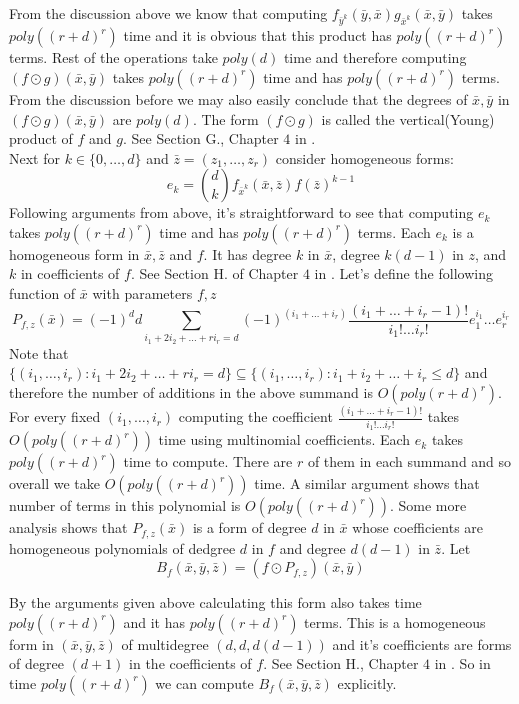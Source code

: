 \documentclass[letterpaper,USenglish,numberwithinsect]{lipics}
\newcommand{\B}[1]{\bar{#1}}
\begin{document}
From the discussion above we know that computing $f_{\B{y}^k}(\B{y},\B{x})g_{\B{x}^k}(\B{x},\B{y})$ takes $poly((r+d)^r)$
time and it is obvious that this product has $poly((r+d)^r)$ terms. Rest of the operations take $poly(d)$ time and therefore
computing $(f\odot g)(\B{x},\B{y})$ takes $poly((r+d)^r)$ time and has $poly((r+d)^r)$ terms. From the discussion before we may also
easily conclude that the degrees of $\B{x},\B{y}$ in $(f\odot g)(\B{x},\B{y})$ are $poly(d)$. The form $(f\odot g)$ is called the
vertical(Young) product of $f$ and $g$. See Section G., Chapter $4$ in \cite{GKZ94}.\\

Next for $k\in \{0,\ldots,d\}$ and $\B{z} = (z_1,\ldots,z_r)$ consider homogeneous forms:
\[
 e_k = {d\choose k}f_{\B{x}^k}(\B{x},\B{z})f(\B{z})^{k-1}
\]
Following arguments from above, it's straightforward to see that computing $e_k$ takes $poly((r+d)^r)$ time and
has $poly((r+d)^r)$ terms.
Each $e_k$ is a homogeneous form in $\B{x},\B{z}$ and $f$. It has degree $k$ in $\B{x}$, degree $k(d-1)$ in $z$, and $k$ in
coefficients of $f$. See Section H. of Chapter $4$ in \cite{GKZ94}. Let's define the following function of $\B{x}$ with parameters $f,z$
\[
 P_{f,z}(\B{x}) = (-1)^dd\sum\limits_{i_1+2i_2+\ldots+ri_r=d}(-1)^{(i_1+\ldots+i_r)}\frac{(i_1+\ldots+i_r-1)!}{i_1!\ldots i_r!}e_1^{i_1}\ldots e_r^{i_r
  }
\]
Note that $\{(i_1,\ldots,i_r) :i_1+2i_2+\ldots+ri_r=d\}\subseteq \{(i_1,\ldots,i_r) : i_1+i_2+\ldots+i_r\leq d\}$ and therefore
the number of additions in the above summand is $O(poly(r+d)^r)$. For every fixed $(i_1,\ldots,i_r)$ computing the
coefficient $\frac{(i_1+\ldots+i_r-1)!}{i_1!\ldots i_r!}$ takes $O(poly((r+d)^r))$ time using multinomial coefficients.
Each $e_k$ takes $poly((r+d)^r)$ time to compute. There are $r$ of them in each summand and so overall we take
$O(poly((r+d)^r))$ time. A similar argument shows that number of terms in this polynomial is $O(poly((r+d)^r))$. Some more
analysis shows that $P_{f,z}(\B{x})$ is a form of degree $d$ in $\B{x}$ whose coefficients are homogeneous polynomials
of dedgree $d$ in $f$ and degree $d(d-1)$ in $\B{z}$. Let
\[
 B_f({\B{x},\B{y},\B{z}}) = (f\odot P_{f,z})(\B{x},\B{y})
\]

By the arguments given above calculating this form also takes time $poly((r+d)^r)$ and it has $poly((r+d)^r)$ terms.
This is a homogeneous form in $(\B{x},\B{y},\B{z})$ of multidegree $(d,d,d(d-1))$ and it's coefficients are forms
of degree $(d+1)$ in the coefficients of $f$. See Section H., Chapter $4$ in \cite{GKZ94}.
So in time $poly((r+d)^r)$ we can compute $B_f({\B{x},\B{y},\B{z}})$ explicitly.\\
\end{document}
